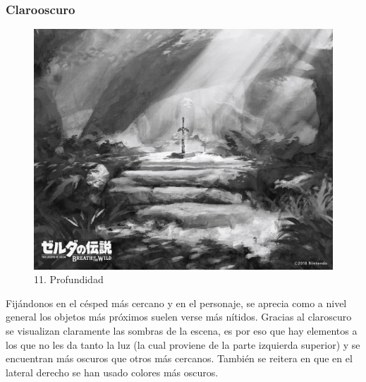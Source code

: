 \documentclass[12pt]{article}
\begin{document}
    \subsubsection{Clarooscuro}
        \begin{figure}[H]
      \centering
      \includegraphics[scale=0.35]{images/Carlos/12/Grises.jpg}
      \caption{\small 11. Profundidad}
    \end{figure}
    Fijándonos en el césped más cercano y en el personaje, se aprecia como a nivel general los objetos más próximos suelen verse más nítidos. Gracias al claroscuro se visualizan claramente las sombras de la escena, es por eso que hay elementos a los que no les da tanto la luz (la cual proviene de la parte izquierda superior) y se encuentran más oscuros que otros más cercanos. También se reitera en que en el lateral derecho se han usado colores más oscuros.
\end{document}
